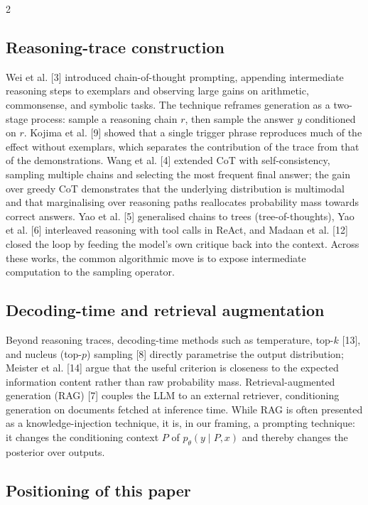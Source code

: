 \documentclass{article}
\begin{document}
\begin{multicols}{2}
\subsection{Reasoning-trace construction}

Wei et al. [3] introduced chain-of-thought prompting, appending intermediate reasoning steps to exemplars and observing large gains on arithmetic, commonsense, and symbolic tasks. The technique reframes generation as a two-stage process: sample a reasoning chain $r$, then sample the answer $y$ conditioned on $r$. Kojima et al. [9] showed that a single trigger phrase reproduces much of the effect without exemplars, which separates the contribution of the trace from that of the demonstrations. Wang et al. [4] extended CoT with self-consistency, sampling multiple chains and selecting the most frequent final answer; the gain over greedy CoT demonstrates that the underlying distribution is multimodal and that marginalising over reasoning paths reallocates probability mass towards correct answers. Yao et al. [5] generalised chains to trees (tree-of-thoughts), Yao et al. [6] interleaved reasoning with tool calls in ReAct, and Madaan et al. [12] closed the loop by feeding the model's own critique back into the context. Across these works, the common algorithmic move is to expose intermediate computation to the sampling operator.

\subsection{Decoding-time and retrieval augmentation}

Beyond reasoning traces, decoding-time methods such as temperature, top-$k$ [13], and nucleus (top-$p$) sampling [8] directly parametrise the output distribution; Meister et al. [14] argue that the useful criterion is closeness to the expected information content rather than raw probability mass. Retrieval-augmented generation (RAG) [7] couples the LLM to an external retriever, conditioning generation on documents fetched at inference time. While RAG is often presented as a knowledge-injection technique, it is, in our framing, a prompting technique: it changes the conditioning context $P$ of $p_\theta(y \mid P, x)$ and thereby changes the posterior over outputs.

\subsection{Positioning of this paper}


\end{multicols}
\end{document}
